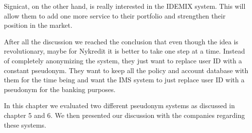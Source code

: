 Signicat, on the other hand, is really interested in the IDEMIX system. This will allow them to add one more service to their portfolio and strengthen their position in the market.

After all the discussion we reached the conclusion that even though the idea is revolutionary, maybe for Nykredit it is better to take one step at a time. Instead of completely anonymizing the system, they just want to replace user ID with a constant pseudonym. They want to keep all the policy and account database with them for the time being and want the IMS system to just replace user ID with a pseudonym for the banking purposes.

In this chapter we evaluated two different pseudonym systems as discussed in chapter 5 and 6. We then presented our discussion with the companies regarding these systems.
